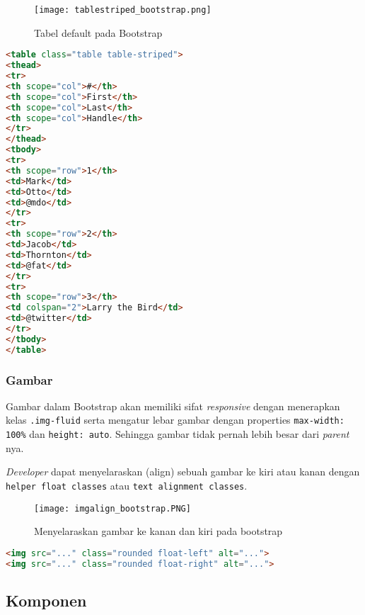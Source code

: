 \begin{figure} [H]
	\centering  
	\texttt{[image: tablestriped\_bootstrap.png]}  
	\caption{Tabel default pada Bootstrap} 
	\label{fig:tableStripedBootstrap}
\end{figure}

\begin{lstlisting}[language=HTML,  basicstyle=\ttfamily, frame=single, columns=fullflexible, keepspaces=true, breaklines=true, showstringspaces=false, label={lst:tablestripedBootstrap}, caption=Kode tabel dengan warna baris berbeda pada bootstrap 4.] 
<table class="table table-striped">
<thead>
<tr>
<th scope="col">#</th>
<th scope="col">First</th>
<th scope="col">Last</th>
<th scope="col">Handle</th>
</tr>
</thead>
<tbody>
<tr>
<th scope="row">1</th>
<td>Mark</td>
<td>Otto</td>
<td>@mdo</td>
</tr>
<tr>
<th scope="row">2</th>
<td>Jacob</td>
<td>Thornton</td>
<td>@fat</td>
</tr>
<tr>
<th scope="row">3</th>
<td colspan="2">Larry the Bird</td>
<td>@twitter</td>
</tr>
</tbody>
</table>
\end{lstlisting}


\subsubsection{Gambar}
Gambar dalam Bootstrap akan memiliki sifat \textit{responsive} dengan menerapkan kelas \texttt{.img-fluid} serta mengatur lebar gambar dengan properties \texttt{max-width: 100\%} dan \texttt{height: auto}. Sehingga gambar tidak pernah lebih besar dari \textit{parent} nya. 

\textit{Developer} dapat menyelaraskan (align) sebuah gambar ke kiri atau kanan dengan \texttt{helper float classes} atau \texttt{text alignment classes}. 
\begin{figure} [H]
	\centering  
	\texttt{[image: imgalign\_bootstrap.PNG]}  
	\caption{Menyelaraskan gambar ke kanan dan kiri pada bootstrap} 
	\label{fig:imageAlignStripedBootstrap}
\end{figure}
\begin{lstlisting}[language=HTML,  basicstyle=\ttfamily, frame=single, columns=fullflexible, keepspaces=true, breaklines=true, showstringspaces=false, label={lst:imgalignBootstrap}, caption=Image Align pada bootstrap 4.]
<img src="..." class="rounded float-left" alt="...">
<img src="..." class="rounded float-right" alt="...">
\end{lstlisting}



\subsection{Komponen}
